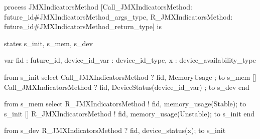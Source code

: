 process JMXIndicatorsMethod 
 [Call_JMXIndicatorsMethod: future_id#JMXIndicatorsMethod_args_type, 
 R_JMXIndicatorsMethod: future_id#JMXIndicatorsMethod_return_type] is
				
 states s_init, s_mem, s_dev
	
 var fid           : future_id,
       device_id_var : device_id_type,
	   x             : device_availability_type
		
 from s_init select
	   Call_JMXIndicatorsMethod ? fid, MemoryUsage        ; to s_mem
	[] Call_JMXIndicatorsMethod ? fid, DeviceStatus(device_id_var) ; to s_dev
 end
		
 from s_mem select
	   R_JMXIndicatorsMethod ! fid, memory_usage(Stable); to s_init
	[] R_JMXIndicatorsMethod ! fid, memory_usage(Unstable); to s_init	
 end	
	
 from s_dev 
	   R_JMXIndicatorsMethod ? fid, device_status(x); to s_init

